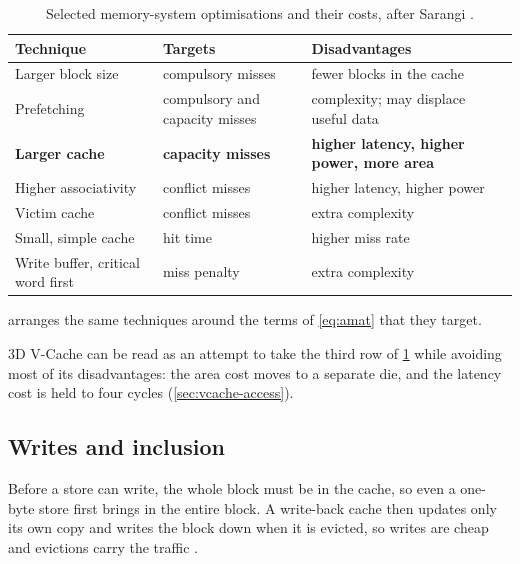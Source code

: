 \begin{table}[htbp]
  \centering
  \caption[Selected memory-system optimisations and their costs, after Sarangi]{Selected memory-system optimisations and their costs, after Sarangi \cite[Table~11.2]{sarangi2025basic}.}
  \label{tab:cache-optimisations}
  \small
  \begin{tabularx}{\textwidth}{@{}>{\raggedright\arraybackslash}p{4.3cm}>{\raggedright\arraybackslash}p{4.2cm}>{\raggedright\arraybackslash}X@{}}
    \toprule
    \textbf{Technique} & \textbf{Targets} & \textbf{Disadvantages} \\
    \midrule
    Larger block size & compulsory misses & fewer blocks in the cache \\
    Prefetching & compulsory and capacity misses & complexity; may displace useful data \\
    \textbf{Larger cache} & \textbf{capacity misses} & \textbf{higher latency, higher power, more area} \\
    Higher associativity & conflict misses & higher latency, higher power \\
    Victim cache & conflict misses & extra complexity \\
    Small, simple cache & hit time & higher miss rate \\
    Write buffer, critical word first & miss penalty & extra complexity \\
    \bottomrule
  \end{tabularx}
\end{table}

 arranges the same techniques around the terms of \cref{eq:amat} that they target.




3D V-Cache can be read as an attempt to take the third row of \cref{tab:cache-optimisations} while avoiding most of its disadvantages: the area cost moves to a separate die, and the latency cost is held to four cycles (\cref{sec:vcache-access}).

\subsection{Writes and inclusion}
\label{sec:writes-inclusion}
Before a store can write, the whole block must be in the cache, so even a one-byte store first brings in the entire block. A write-back cache then updates only its own copy and writes the block down when it is evicted, so writes are cheap and evictions carry the traffic \cite[sec.~11.2.3]{sarangi2025basic}.

